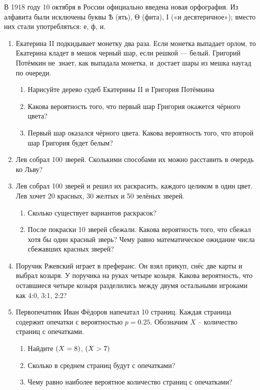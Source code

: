 \documentclass[10pt,a4paper]{article}
\let\P\relax
\DeclareMathOperator{\P}{\mathbb{P}}
\begin{document}
В 1918 году 10 октября в России официально введена новая орфография. Из алфавита были исключены буквы Ѣ (ять), Ѳ (фита), І («и десятеричное»); вместо них стали употребляться: е, ф, и.


\begin{enumerate}

\item Екатерина II подкидывает монетку два раза. Если монетка выпадает орлом, то Екатерина кладет в мешок черный шар, если решкой — белый. Григорий Потёмкин не~знает, как выпадала монетка, и~достает шары из мешка наугад по очереди.
  \begin{enumerate}
    \item Нарисуйте дерево судеб Екатерины II и Григория Потёмкина
    \item Какова вероятность того, что первый шар Григория окажется чёрного цвета?
    \item Первый шар оказался чёрного цвета. Какова вероятность того, что второй шар Григория будет белым?
  \end{enumerate}

\item Лев собрал 100 зверей. Сколькими способами их можно расставить в очередь ко Льву?
\item Лев собрал 100 зверей и решил их раскрасить, каждого целиком в один цвет. Лев хочет 20 красных, 30 желтых и 50 зелёных зверей.
\begin{enumerate}
  \item Сколько существует вариантов раскрасок?
  \item После покраски 10 зверей сбежали. Какова вероятность того, что сбежал хотя бы один красный зверь? Чему равно математическое ожидание числа сбежавших красных зверей?
\end{enumerate}

\item Поручик Ржевский играет в преферанс. Он взял прикуп, снёс две карты и выбрал козыря. У поручика на руках четыре козыря. Какова вероятность, что оставшиеся четыре козыря разделились между двумя остальными игроками как 4:0, 3:1, 2:2?

\item Первопечатник Иван Фёдоров напечатал 10 страниц. Каждая страница содержит опечатки с вероятностью $p=0.25$. Обозначим $X$ – количество страниц с опечатками.
\begin{enumerate}
  \item Найдите $\P(X=8)$, $\P(X>7)$
  \item Сколько в среднем страниц будут с опечатками?
  \item Чему равно наиболее вероятное количество страниц с опечатками?
\end{enumerate}


\end{enumerate}
\end{document}
